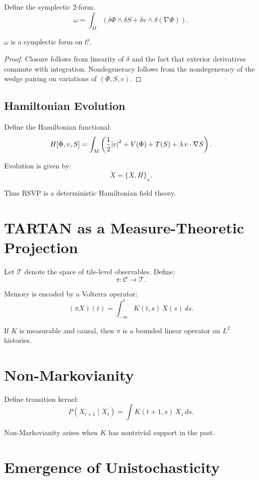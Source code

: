 \documentclass[11pt]{article}
\begin{document}
Define the symplectic 2-form:
\[
\omega = \int_M \left( \delta \Phi \wedge \delta S +
\delta v \wedge \delta(\nabla \Phi) \right).
\]

\begin{theorem}
$\omega$ is a symplectic form on $\mathcal{C}$.
\end{theorem}

\begin{proof}
Closure follows from linearity of $\delta$ and the fact that exterior
derivatives commute with integration. Nondegeneracy follows from the
nondegeneracy of the wedge pairing on variations of $(\Phi,S,v)$.
\end{proof}

\subsection{Hamiltonian Evolution}

Define the Hamiltonian functional:
\[
H[\Phi,v,S] = \int_M \left(
\frac{1}{2}\abs{v}^2 + V(\Phi) + T(S) + \lambda\, v\cdot\nabla S
\right).
\]

Evolution is given by:
\[
\dot{X} = \{X,H\}_\omega.
\]

Thus RSVP is a deterministic Hamiltonian field theory.

\section{TARTAN as a Measure-Theoretic Projection}

Let $\mathcal{T}$ denote the space of tile-level observables. Define:
\[
\pi : \mathcal{C} \to \mathcal{T}.
\]

Memory is encoded by a Volterra operator:
\[
(\pi X)(t) = \int_{-\infty}^t K(t,s)\, X(s)\, ds.
\]

\begin{theorem}
If $K$ is measurable and causal, then $\pi$ is a bounded linear operator on
$L^2$ histories.
\end{theorem}

\section{Non-Markovianity}

Define transition kernel:
\[
P(X_{t+1} \mid X_t) = \int K(t+1,s)\, X_s\, ds.
\]

Non-Markovianity arises when $K$ has nontrivial support in the past.

\section{Emergence of Unistochasticity}
\end{document}
